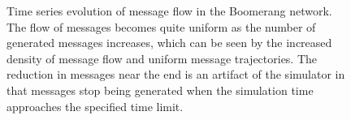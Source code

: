\begin{figure}
\begin{center}
\begin{tabular}{ccc}
\end{tabular}
\end{center}
\caption{Time series evolution of message flow in the Boomerang network. The flow of messages becomes quite uniform as the number of generated messages increases, which can be seen by the increased density of message flow and uniform message trajectories. The reduction in messages near the end is an artifact of the simulator in that messages stop being generated when the simulation time approaches the specified time limit.}
\label{fig:small-flow}
\end{figure}


